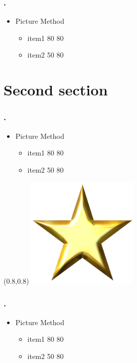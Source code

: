 \documentclass[12pt,t]{beamer}
\begin{document}
\begin{frame}
\frametitle{\thesection.~\insertsection}
\begin{itemize}
\item Picture Method
\begin{itemize}
\item item1 80 80 
\item item2 50 80
\end{itemize}
\end{itemize}
\end{frame}





\section{Second section}
\begin{frame}
\frametitle{\thesection.~\insertsection}
\begin{itemize}
\item Picture Method
\begin{itemize}
\item item1 80 80 
\item item2 50 80
\end{itemize}
\end{itemize}

\begin{textblock*}{0.45\textwidth}(0.8\textwidth,0.8\textheight)
\includegraphics[width=0.40\textwidth]{star.jpg}
\end{textblock*}

\end{frame}




\begin{frame}
\frametitle{\thesection.~\insertsection}
\begin{itemize}
\item Picture Method
\begin{itemize}
\item item1 80 80 
\item item2 50 80
\end{itemize}
\end{itemize}
\end{frame}
\end{document}
